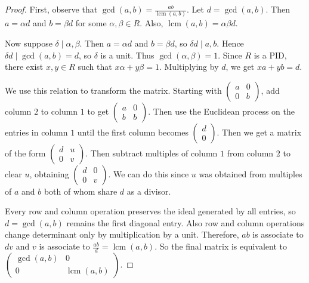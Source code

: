 \documentclass[addpoints,10pt]{exam}
\theoremstyle{plain}
\theoremstyle{definition}
\theoremstyle{plain}
\theoremstyle{plain}
\theoremstyle{definition}
\DeclareMathOperator{\lcm}{lcm}
\begin{document}
\begin{proof}
First, observe that $\gcd(a,b)=\frac{ab}{\lcm(a,b)}$. Let
$d=\gcd(a,b)$. Then $a=\alpha d$ and $b=\beta d$ for some
$\alpha,\beta\in R$. Also, $\lcm(a,b)=\alpha\beta d$.

Now suppose $\delta\mid \alpha,\beta$. Then
$a=\alpha d$ and $b=\beta d$, so $\delta d\mid a,b$. Hence
$\delta d\mid \gcd(a,b)=d$, so $\delta$ is a unit. Thus
$\gcd(\alpha,\beta)=1$. Since $R$ is a PID, there exist $x,y\in R$
such that $x\alpha+y\beta=1$. Multiplying by $d$, we get
$xa+yb=d$.

We use this relation to transform the matrix. Starting with
$\begin{pmatrix} a&0\\0&b\end{pmatrix}$, add column $2$ to column $1$
to get $\begin{pmatrix} a&0\\b&b\end{pmatrix}$. Then use the Euclidean
process on the entries in column $1$ until the first column becomes
$\begin{pmatrix} d\\0\end{pmatrix}$. Then we get a matrix of the form
$\begin{pmatrix} d&u\\0&v\end{pmatrix}$. Then subtract multiples of
column $1$ from column $2$ to clear $u$, obtaining
$\begin{pmatrix} d&0\\0&v\end{pmatrix}$. We can do this since $u$ was obtained from multiples of $a$ and $b$ both of whom share $d$ as a divisor.

Every row and column operation preserves the ideal generated by all
entries, so $d=\gcd(a,b)$ remains the first diagonal entry. Also row and
column operations change determinant only by multiplication by a unit.
Therefore, $ab$ is associate to $dv$ and $v$ is associate to
$\frac{ab}{d}=\lcm(a,b)$. So the final matrix is equivalent to
$\begin{pmatrix} \gcd(a,b)&0\\0&\lcm(a,b)\end{pmatrix}$.


\end{proof}
\end{document}
